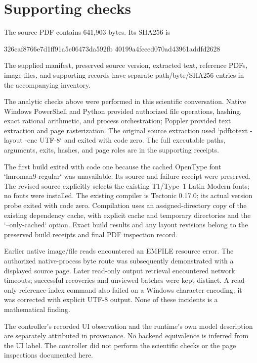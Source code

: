 \documentclass[10pt]{article}
\begin{document}
\section*{Supporting checks}
The source PDF contains 641,903 bytes. Its SHA256 is\par
326caf8766e7d1ff91a5c06473da592fb
40199a4fceed070ad43961addfd2628\par
The supplied manifest, preserved source version, extracted text, reference PDFs, image files, and supporting records have separate path/byte/SHA256 entries in the accompanying inventory.\par
The analytic checks above were performed in this scientific conversation. Native Windows PowerShell and Python provided authorized file operations, hashing, exact rational arithmetic, and process orchestration; Poppler provided text extraction and page rasterization. The original source extraction used `pdftotext -layout -enc UTF-8` and exited with code zero. The full executable paths, arguments, exits, hashes, and page roles are in the supporting receipts.\par
The first build exited with code one because the cached OpenType font `lmroman9-regular` was unavailable. Its source and failure receipt were preserved. The revised source explicitly selects the existing T1/Type 1 Latin Modern fonts; no fonts were installed. The existing compiler is Tectonic 0.17.0; its actual version probe exited with code zero. Compilation uses an assigned-directory copy of the existing dependency cache, with explicit cache and temporary directories and the `–only-cached` option. Exact build results and any layout revisions belong to the preserved build receipts and final PDF inspection record.\par
Earlier native image/file reads encountered an EMFILE resource error. The authorized native-process byte route was subsequently demonstrated with a displayed source page. Later read-only output retrieval encountered network timeouts; successful recoveries and unviewed batches were kept distinct. A read-only reference-index command also failed on a Windows character encoding; it was corrected with explicit UTF-8 output. None of these incidents is a mathematical finding.\par
The controller’s recorded UI observation and the runtime’s own model description are separately attributed in provenance. No backend equivalence is inferred from the UI label. The controller did not perform the scientific checks or the page inspections documented here.\par
\end{document}
